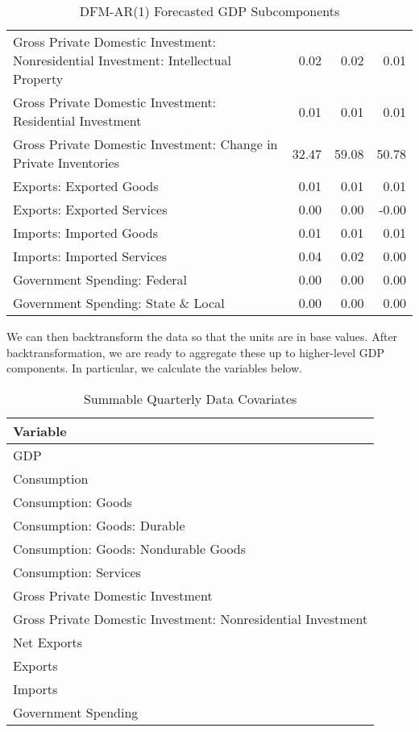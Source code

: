 \documentclass[11pt, letterpaper]{article}\usepackage[]{graphicx}\usepackage[]{color}
\begin{document}
\begin{table}[H]
\begin{tabular}{lrrr}
  Gross Private Domestic Investment: Nonresidential Investment: Intellectual Property & 0.02 & 0.02 & 0.01 \\ 
  Gross Private Domestic Investment: Residential Investment & 0.01 & 0.01 & 0.01 \\ 
  Gross Private Domestic Investment: Change in Private Inventories & 32.47 & 59.08 & 50.78 \\ 
  Exports: Exported Goods & 0.01 & 0.01 & 0.01 \\ 
  Exports: Exported Services & 0.00 & 0.00 & -0.00 \\ 
  Imports: Imported Goods & 0.01 & 0.01 & 0.01 \\ 
  Imports: Imported Services & 0.04 & 0.02 & 0.00 \\ 
  Government Spending: Federal & 0.00 & 0.00 & 0.00 \\ 
  Government Spending: State \& Local & 0.00 & 0.00 & 0.00 \\ 
   \hline
\end{tabular}
\endgroup
\caption{DFM-AR(1) Forecasted GDP Subcomponents} 
\end{table}


We can then backtransform the data so that the units are in base values. After backtransformation, we are ready to aggregate these up to higher-level GDP components. In particular, we calculate the variables below.
\begin{table}[H]
\centering
\begingroup\scriptsize
\begin{tabular}{l}
  \hline
Variable \\ 
  \hline
GDP \\ 
  Consumption \\ 
  Consumption: Goods \\ 
  Consumption: Goods: Durable \\ 
  Consumption: Goods: Nondurable Goods \\ 
  Consumption: Services \\ 
  Gross Private Domestic Investment \\ 
  Gross Private Domestic Investment: Nonresidential Investment \\ 
  Net Exports \\ 
  Exports \\ 
  Imports \\ 
  Government Spending \\ 
   \hline
\end{tabular}
\endgroup
\caption{Summable Quarterly Data Covariates} 
\end{table}
\end{document}
